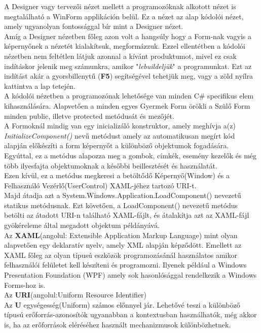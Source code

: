 \documentclass[tocnopagenum]{thesis-ekf}
\theoremstyle{definition}
\theoremstyle{remark}
\begin{document}
	A Designer vagy tervezői nézet mellett a programozóknak alkotott nézet is megtalálható a WinForm applikáción belül. Ez a nézet az alap kódolói nézet, amely ugyanolyan fontossággal bír mint a Designer nézet.
	\\
	Amíg a Designer nézetben főleg azon volt a hangsúly hogy a Form-nak vagyis a képernyőnek a nézetét kialakítsuk, megformázzuk. Ezzel ellentétben a kódolói nézetben nem feltétlen látjuk azonnal a kívánt produktumot, mivel ez csak indításkor jelenik meg számunkra, amikor "\textit{lebuildeljük}" a programunkat. Ezt az indítást akár a gyorsbillenytű (\textbf{F5}) segítségével tehetjük meg, vagy a zöld nyílra kattintva a lap tetején.
	\\
	A kódolói nézetben a programozónak lehetősége van minden C\# specifikus elem kihasználására. Alapvetően a minden egyes Gyermek Form örökli a Szülő Form minden public, illetve protected metódusát és mezőjét. 
	\\
	A Formoknál mindig van egy inicializáló konstruktor, amely meghívja a(z) \textit{InitializeComponent()} nevű metódust amely az automatikusan megírt kód alapján előkészíti a form képernyőt a különböző objektumok fogadására. Egyúttal, ez a metódus alapozza meg a gombok, címkék, esemény kezelők és még több ilyesfajta objektumoknak a későbbi beillesztését és használatát.
\\
Ezen kívül, ez a metódus megkeresi a betöltődő Képernyő(Window) és a Felhasználó Vezérlő(UserControl) XAML-jéhez tartozó URI-t.
\\
Majd átadja azt a System.Windows.Application.LoadComponent() nevezetű statikus metódusnak.
Ezt követően, a LoadComponent() nevezetű metódus betölti az átadott URI-n található XAML-fájlt, és átalakítja azt az XAML-fájl gyökéreleme által megadott objektum példányává.
\\
Az \textbf{XAML}(angolul: Extensible Application Markup Language) mint olyan alapvetően egy deklaratív nyelv, amely XML alapján képződött.
Emellett az XAML főleg az olyan típusú eszközök programozásánál használatos amikor felhasználói felületet kell készíteni és programozni. Ilyenek például a Windows Presentation Foundation (WPF) amely sok hasonlósággal rendelkezik a Windows Forms-hoz is.
\\
Az \textbf{URI}(angolul:Uniform Resource Identifier) \cite{uri}
\\
Az \textbf{U} egységesség(Uniform) számos előnnyel jár. Lehetővé teszi a különböző típusú
erőforrás-azonosítók ugyanabban a kontextusban használhatók, még akkor is, ha
az erőforrások eléréséhez használt mechanizmusok különbözhetnek.
\end{document}
